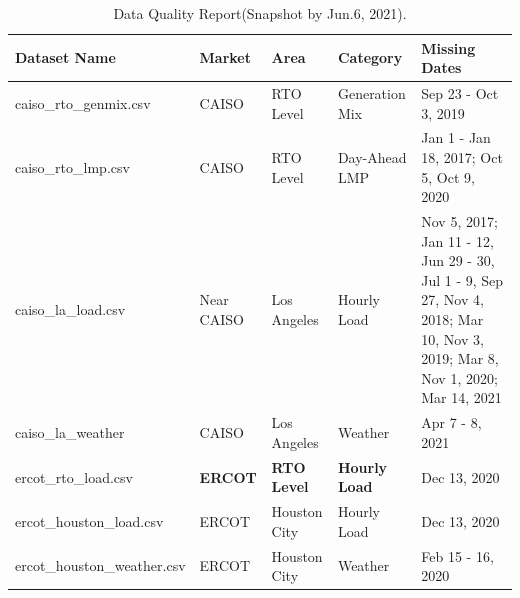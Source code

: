 \documentclass[10pt]{article}
\numberwithin{equation}{section}
\numberwithin{table}{section}
\numberwithin{figure}{section}
\begin{document}
\begin{table}[htbp]
	\scriptsize
	\centering
	\caption{Data Quality Report(Snapshot by Jun.6, 2021).}
	\label{tab:dataqualityreport}
	\begin{tabular}{llllp{}}
	\toprule
	\multicolumn{1}{l}{Dataset Name} & \multicolumn{1}{l}{Market} & \multicolumn{1}{l}{Area} & \multicolumn{1}{l}{Category} & \multicolumn{1}{l}{Missing Dates}                                                           \\
	\midrule
	caiso\_rto\_genmix.csv                    & CAISO                               & RTO Level                         & Generation Mix                        & Sep 23 - Oct 3, 2019                                                                                                         \\
	caiso\_rto\_lmp.csv                       & CAISO                               & RTO Level                         & Day-Ahead LMP                         & Jan 1 - Jan 18, 2017; Oct 5, Oct 9, 2020                                                                                     \\
	caiso\_la\_load.csv                       & Near CAISO                          & Los Angeles                       & Hourly Load                           & Nov 5, 2017; Jan 11 - 12, Jun 29 - 30, Jul 1 - 9, Sep 27, Nov 4, 2018; Mar 10, Nov 3, 2019; Mar 8, Nov 1, 2020; Mar 14, 2021 \\
	caiso\_la\_weather                        & CAISO                               & Los Angeles                       & Weather                               & Apr 7 - 8, 2021                                                                                                              \\
	ercot\_rto\_load.csv                      & \textbf{ERCOT}                      & \textbf{RTO Level}                & \textbf{Hourly Load}                  & Dec 13, 2020                                                                                                                 \\
	ercot\_houston\_load.csv                  & ERCOT                               & Houston City                      & Hourly Load                           & Dec 13, 2020                                                                                                                 \\
	ercot\_houston\_weather.csv               & ERCOT                               & Houston City                      & Weather                               & Feb 15 - 16, 2020                                                                                                            \\

\end{tabular}
\end{table}
\end{document}
